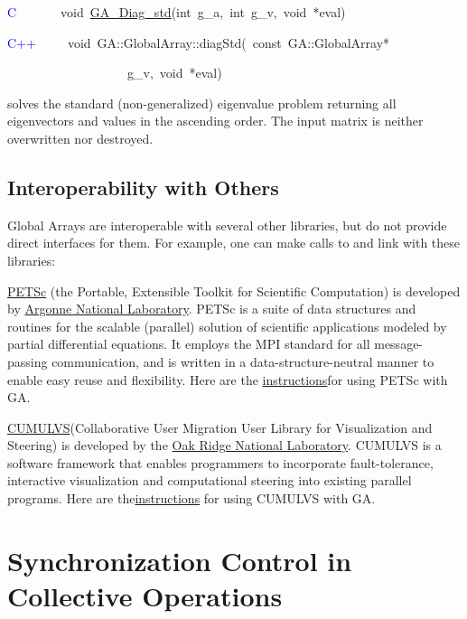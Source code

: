\textcolor{blue}{C}~~~~~~~void~\href{https://hpc.pnl.gov/globalarrays/api/c_op_api.html\#ga_diag_std}{GA\_{}Diag\_{}std}(int~g\_a,~int~g\_v,~void~{*}eval)

\textcolor{blue}{C++}~~~~~void~GA::GlobalArray::diagStd(~const~GA::GlobalArray{*}~

~~~~~~~~~~~~~~~~~~~g\_v,~void~{*}eval)

solves the standard (non-generalized) eigenvalue problem returning
all eigenvectors and values in the ascending order. The input matrix
is neither overwritten nor destroyed. 


\subsection{Interoperability with Others }

Global Arrays are interoperable with several other libraries, but
do not provide direct interfaces for them. For example, one can make
calls to and link with these libraries:

\href{http://www.mcs.anl.gov/petsc/petsc-as/}{PETSc} (the Portable,
Extensible Toolkit for Scientific Computation) is developed by \href{http://www.anl.gov/}{Argonne National Laboratory}.
PETSc is a suite of data structures and routines for the scalable
(parallel) solution of scientific applications modeled by partial
differential equations. It employs the MPI standard for all message-passing
communication, and is written in a data-structure-neutral manner to
enable easy reuse and flexibility. Here are the \href{http://www.emsl.pnl.gov/docs/global/petsc.html}{instructions}for
using PETSc with GA. 

\href{http://www.csm.ornl.gov/cs/cumulvs.html}{CUMULVS}(Collaborative
User Migration User Library for Visualization and Steering) is developed
by the \href{http://www.ornl.gov/}{Oak Ridge National Laboratory}.
CUMULVS is a software framework that enables programmers to incorporate
fault-tolerance, interactive visualization and computational steering
into existing parallel programs. Here are the\href{http://www.emsl.pnl.gov/docs/global/cumulvs.html}{instructions}
for using CUMULVS with GA. 


\section{Synchronization Control in Collective Operations }

